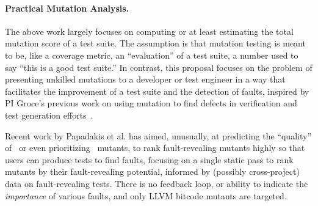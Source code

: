 \paragraph{Practical Mutation Analysis.}
%
The above work largely focuses on computing or at least estimating the
total mutation score of a
test suite.  The assumption is that mutation testing is
meant to be, like a coverage metric, an ``evaluation'' of a
test suite, a number used to say ``this is a good test suite.''  In contrast,
this proposal focuses on the problem of presenting unkilled mutations to
a developer or test engineer in a way that facilitates the improvement
of a test suite and the detection of faults, inspired by PI Groce's
previous work on using mutation to find defects in verification
and test generation
efforts~\cite{groce2015verified,groce2018verified,mutKernel}.

Recent work by Papadakis et al. has
aimed, unusually, at predicting the ``quality'' of~\cite{MutQuality}
or even prioritizing~\cite{FaRM} mutants, to rank fault-revealing
mutants highly so that users can produce tests to find faults, focusing on a single static
pass to rank mutants by their fault-revealing potential, informed by
(possibly cross-project)
data on fault-revealing tests.  There is no feedback loop, or ability
to indicate the \emph{importance} of various faults, and only LLVM
bitcode mutants are targeted.  %

